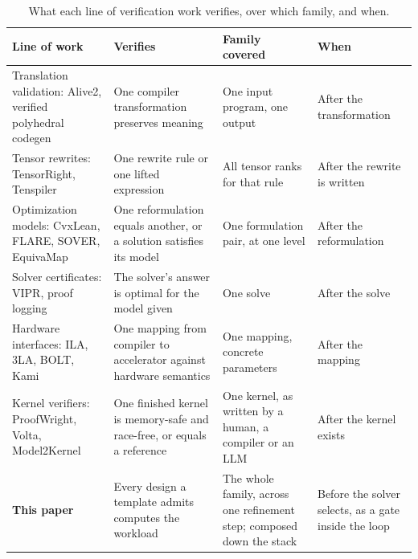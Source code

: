 \documentclass[11pt]{article}
\begin{document}
\begin{table}[tb]
\small
\begin{tabular}{@{}L{0.26\textwidth}L{0.26\textwidth}L{0.22\textwidth}L{0.14\textwidth}@{}}
\toprule
Line of work & Verifies & Family covered & When \\
\midrule
Translation validation: Alive2, verified polyhedral codegen \cite{r40,r41,r42} & One compiler transformation preserves meaning & One input program, one output & After the transformation \\
Tensor rewrites: TensorRight, Tenspiler \cite{r43,r44} & One rewrite rule or one lifted expression & All tensor ranks for that rule & After the rewrite is written \\
Optimization models: CvxLean, FLARE, SOVER, EquivaMap \cite{r33,r11,r14,r13} & One reformulation equals another, or a solution satisfies its model & One formulation pair, at one level & After the reformulation \\
Solver certificates: VIPR, proof logging \cite{r35,r36} & The solver's answer is optimal for the model given & One solve & After the solve \\
Hardware interfaces: ILA, 3LA, BOLT, Kami \cite{r45,r46,r47,r48} & One mapping from compiler to accelerator against hardware semantics & One mapping, concrete parameters & After the mapping \\
Kernel verifiers: ProofWright, Volta, Model2Kernel \cite{r103,r104,r106} & One finished kernel is memory-safe and race-free, or equals a reference & One kernel, as written by a human, a compiler or an LLM & After the kernel exists \\
\midrule
\textbf{This paper} & Every design a template admits computes the workload & The whole family, across one refinement step; composed down the stack & Before the solver selects, as a gate inside the loop \\
\bottomrule
\end{tabular}
\caption{What each line of verification work verifies, over which family, and when.}
\label{tab:verifiers}
\end{table}
\end{document}
